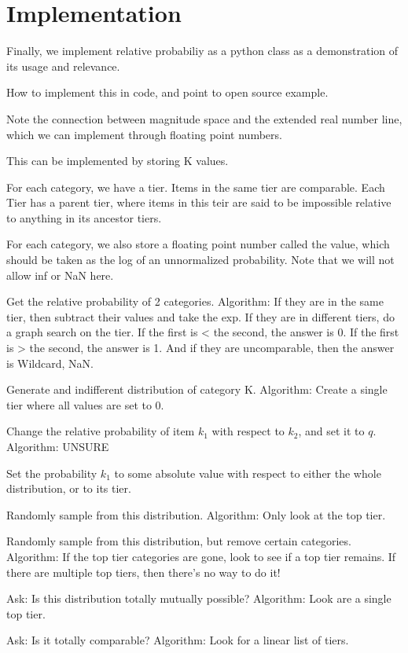 \documentclass[twoside]{article}
\theoremstyle{plain}%
\theoremstyle{definition}
\theoremstyle{remark}
\begin{document}
\section{Implementation}

Finally, we implement relative probabiliy as a python class as a demonstration of its usage and relevance.

How to implement this in code, and point to open source example.

Note the connection between magnitude space and the extended real number line, which we can implement through floating point numbers.

This can be implemented by storing K values.

For each category, we have a tier. Items in the same tier are comparable. Each Tier has a parent tier, where items in this teir are said to be impossible relative to anything in its ancestor tiers.

For each category, we also store a floating point number called the value, which should be taken as the log of an unnormalized probability. Note that we will not allow inf or NaN here.

Get the relative probability of 2 categories. Algorithm: If they are in the same tier, then subtract their values and take the exp. If they are in different tiers, do a graph search on the tier. If the first is < the second, the answer is 0. If the first is > the second, the answer is 1. And if they are uncomparable, then the answer is Wildcard, NaN.

Generate and indifferent distribution of category K. Algorithm: Create a single tier where all values are set to 0.

Change the relative probability of item \(k_1\) with respect to \(k_2\), and set it to \(q\). Algorithm: UNSURE

Set the probability \(k_1\) to some absolute value with respect to either the whole distribution, or to its tier.

Randomly sample from this distribution. Algorithm: Only look at the top tier.

Randomly sample from this distribution, but remove certain categories. Algorithm: If the top tier categories are gone, look to see if a top tier remains. If there are multiple top tiers, then there's no way to do it!

Ask: Is this distribution totally mutually possible? Algorithm: Look are a single top tier.

Ask: Is it totally comparable? Algorithm: Look for a linear list of tiers.
\end{document}
